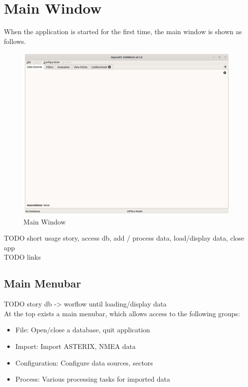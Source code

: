 \section{Main Window}
\label{sec:ui_main_window} 

When the application is started for the first time, the main window is shown as follows. 

\begin{figure}[H]
  \hspace*{-2.5cm}
    \includegraphics[width=19cm]{figures/main_window.png}
  \caption{Main Window}
\end{figure}

TODO short usage story, access db, add / process data, load/display data, close app \\
TODO links \\

\subsection{Main Menubar}

TODO story db -> worflow until loading/display data \\

At the top exists a main menubar, which allows access to the following groups:

\begin{itemize}
 \item File: Open/close a database, quit application
 \item Import: Import ASTERIX, NMEA data
 \item Configuration: Configure data sources, sectors
 \item Process: Various processing tasks for imported data
\end{itemize}
\  \\

